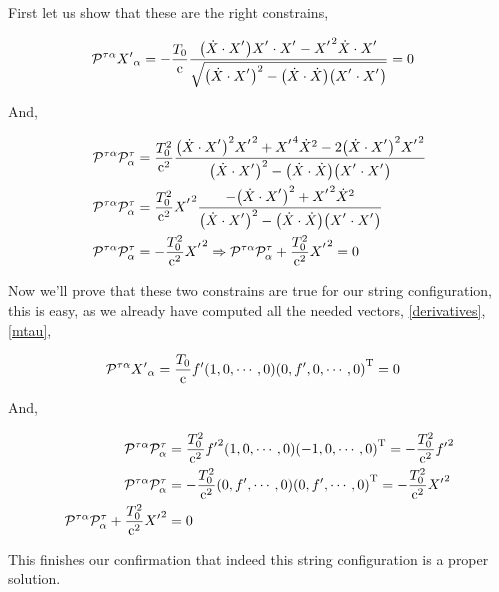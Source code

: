 First let us show that these are the right constrains,

\begin{align*}
    \mathcal P^{\tau\alpha}{X'}_\alpha&=-\frac{T_0}{\luz}\frac{\qty(\dot X\cdot X^\sidev){X^\sidev\cdot X^\sidev}-{X^\sidev}^2{\dot X\cdot X^\sidev}}{\sqrt{\qty(\dot X\cdot X^\sidev)^2- \qty(\dot X\cdot \dot X)\qty(X^\sidev\cdot X^\sidev) }}=0
\end{align*}

And,

\begin{align*}
    \mathcal P^{\tau\alpha}\mathcal P^{\tau}_\alpha&=\frac{T_0^2}{\luz^2}\frac{\qty(\dot X\cdot X^\sidev)^2{X^\sidev}^2+{X^\sidev}^4{\dot X}^2-2\qty(\dot X\cdot X^\sidev)^2{X^\sidev}^2}{\qty(\dot X\cdot X^\sidev)^2- \qty(\dot X\cdot \dot X)\qty(X^\sidev\cdot X^\sidev) }\\
    \mathcal P^{\tau\alpha}\mathcal P^{\tau}_\alpha&=\frac{T_0^2}{\luz^2}{X^\sidev}^2\frac{-\qty(\dot X\cdot X^\sidev)^2+{X^\sidev}^2{\dot X}^2}{\qty(\dot X\cdot X^\sidev)^2- \qty(\dot X\cdot \dot X)\qty(X^\sidev\cdot X^\sidev) }\\
    \mathcal P^{\tau\alpha}\mathcal P^{\tau}_\alpha&=-\frac{T_0^2}{\luz^2}{X^\sidev}^2\Rightarrow \mathcal P^{\tau\alpha}\mathcal P^{\tau}_\alpha+\frac{T_0^2}{\luz^2}{X^\sidev}^2=0
\end{align*}

Now we'll prove that these two constrains are true for our string configuration, this is easy, as we already have computed all the 
needed vectors, \ref{derivatives},\ref{mtau},

\begin{align*}
    \mathcal P^{\tau\alpha}{X'}_\alpha&=\frac{T_0}{\textnormal{c}}f'\qty(1,0,\cdots,0){\qty(0,f',0,\cdots,0)}^{\textnormal{T}}=0
\end{align*}

And,

\begin{align*}
    \mathcal P^{\tau\alpha}\mathcal P^{\tau}_\alpha&=\frac{T_0^2}{\textnormal{c}^2}{f'}^2\qty(1,0,\cdots,0){\qty(-1,0,\cdots,0)}^{\textnormal{T}}=-\frac{T_0^2}{\textnormal{c}^2}{f'}^2\\
    \mathcal P^{\tau\alpha}\mathcal P^{\tau}_\alpha&=-\frac{T_0^2}{\textnormal{c}^2}\qty(0,f',\cdots,0){\qty(0,f',\cdots,0)}^{\textnormal{T}}=-\frac{T_0^2}{\textnormal{c}^2}{X'}^2\\
    \mathcal P^{\tau\alpha}\mathcal P^{\tau}_\alpha+\frac{T_0^2}{\textnormal{c}^2}{X'}^2&=0
\end{align*}

This finishes our confirmation that indeed this string configuration is a proper solution.

